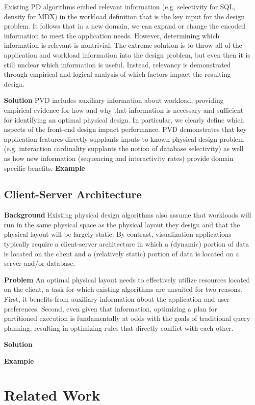 Existing PD algorithms embed relevant information (e.g. selectivity for SQL, density for MDX) in the workload definition that is the key input for the design problem. It follows that in a new domain, we can expand or change the encoded information to meet the application needs. However, determining which information is relevant is nontrivial. The extreme solution is to throw all of the application and workload information into the design problem, but even then it is still unclear which information is useful. Instead, relevancy is demonstrated through empirical and logical analysis of which factors impact the resulting design. 

\textbf{Solution} PVD includes auxiliary information about workload, providing empirical evidence for how and why that information is necessary and sufficient for identifying an optimal physical design. In particular, we clearly define which aspects of the front-end design impact performance. PVD demonstrates that key application features directly supplants inputs to known physical design problem (e.g. interaction cardinality supplants the notion of database selectivity) as well as how new information (sequencing and interactivity rates) provide domain specific benefits. 
\textbf{Example}

\subsection{Client-Server Architecture}
\textbf{Background}
Existing physical design algorithms also assume that workloads will run in the same physical space as the physical layout they design and that the physical layout will be largely static. By contrast, visualization applications typically require a client-server architecture in which a (dynamic) portion of data is located on the client and a (relatively static) portion of data is located on a server and/or database. 

\textbf{Problem}
 An optimal physical layout needs to effectively utilize resources located on the client, a task for which existing algorithms are unsuited for two reasons. First, it benefits from auxiliary information about the application and user preferences. Second, even given that information, optimizing a plan for partitioned execution is fundamentally at odds with the goals of traditional query planning, resulting in optimizing rules that directly conflict with each other.


\textbf{Solution}


\textbf{Example}


\section{Related Work}

